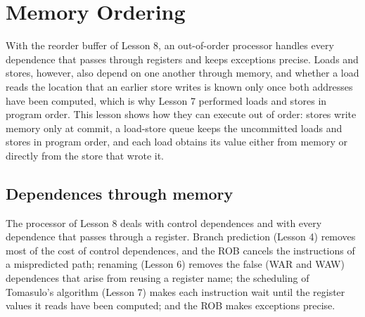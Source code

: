 \documentclass[../main.tex]{subfiles}
\begin{document}
\chapter{Memory Ordering}

With the reorder buffer of Lesson 8, an out-of-order processor handles every
dependence that passes through registers and keeps exceptions precise.  Loads
and stores, however, also depend on one another through memory, and whether a
load reads the location that an earlier store writes is known only once both
addresses have been computed, which is why Lesson 7 performed loads and stores
in program order.  This lesson shows how they can execute out of order: stores
write memory only at commit, a load-store queue keeps the uncommitted loads and
stores in program order, and each load obtains its value either from memory or
directly from the store that wrote it.

\section{Dependences through memory}
\label{sec:l09-dependences}

The processor of Lesson 8 deals with control dependences and with every
dependence that passes through a register.  Branch prediction
(Lesson 4) removes most of the cost of control dependences, and the ROB cancels
the instructions of a mispredicted path; renaming (Lesson 6) removes the false
(WAR and WAW) dependences that arise from reusing a register name; the scheduling of Tomasulo's
algorithm (Lesson 7) makes each instruction wait until the register values it
reads have been computed; and the ROB makes exceptions precise.
\end{document}
